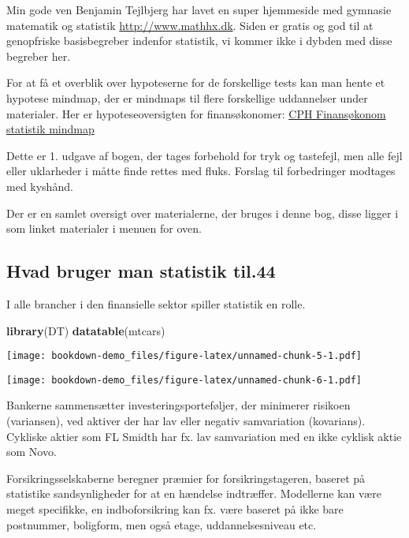 \documentclass[]{book}
\newenvironment{Shaded}{\begin{snugshade}}{\end{snugshade}}
\newcommand{\KeywordTok}[1]{\textcolor[rgb]{0.13,0.29,0.53}{\textbf{#1}}}
\newcommand{\NormalTok}[1]{#1}
\theoremstyle{definition}
\theoremstyle{definition}
\theoremstyle{definition}
\theoremstyle{remark}
\begin{document}
Min gode ven Benjamin Tejlbjerg har lavet en super hjemmeside med
gymnasie matematik og statistik
\href{http://www.mathhx.dk/?q=node/117}{http://www.mathhx.dk}. Siden er
gratis og god til at genopfriske basisbegreber indenfor statistik, vi
kommer ikke i dybden med disse begreber her.

For at få et overblik over hypoteserne for de forskellige tests kan man
hente et hypotese mindmap, der er mindmaps til flere forskellige
uddannelser under materialer. Her er hypoteseoversigten for
finansøkonomer:
\href{https://drive.google.com/uc?export=download\&id=0B1E7VnhxsDMlQ1Zhdjh5WTJ4bnM}{CPH
Finansøkonom statistik mindmap}

Dette er 1. udgave af bogen, der tages forbehold for tryk og tastefejl,
men alle fejl eller uklarheder i måtte finde rettes med fluks. Forslag
til forbedringer modtages med kyshånd.

Der er en samlet oversigt over materialerne, der bruges i denne bog,
disse ligger i som linket materialer i menuen for oven.

\hypertarget{hvad-bruger-man-statistik-til.44}{%
\subsection{Hvad bruger man statistik
til.44}\label{hvad-bruger-man-statistik-til.44}}

I alle brancher i den finansielle sektor spiller statistik en rolle.

\begin{Shaded}
\begin{Highlighting}[]
\KeywordTok{library}\NormalTok{(DT)}
\KeywordTok{datatable}\NormalTok{(mtcars)}
\end{Highlighting}
\end{Shaded}

\texttt{[image: bookdown-demo\_files/figure-latex/unnamed-chunk-5-1.pdf]}

\texttt{[image: bookdown-demo\_files/figure-latex/unnamed-chunk-6-1.pdf]}

Bankerne sammensætter investeringsporteføljer, der minimerer risikoen
(variansen), ved aktiver der har lav eller negativ samvariation
(kovarians). Cykliske aktier som FL Smidth har fx. lav samvariation med
en ikke cyklisk aktie som Novo.

Forsikringsselskaberne beregner præmier for forsikringstageren, baseret
på statistike sandsynligheder for at en hændelse indtræffer. Modellerne
kan være meget specifikke, en indboforsikring kan fx. være baseret på
ikke bare postnummer, boligform, men også etage, uddannelsesniveau etc.
\end{document}
